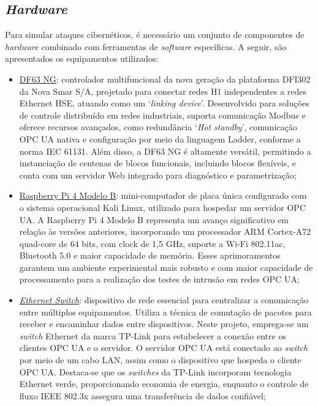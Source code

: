     \subsection{\textit{Hardware}}

        Para simular ataques cibernéticos, é necessário um conjunto de componentes de \textit{hardware} combinado com ferramentas de \textit{software} específicas. A seguir, são apresentados os equipamentos utilizados:

        \begin{itemize}
            \item \underline{DF63 NG}: controlador multifuncional da nova geração da plataforma DFI302 da Nova Smar S/A, projetado para conectar redes H1 independentes a redes Ethernet HSE, atuando como um `\textit{linking device}'. Desenvolvido para soluções de controle distribuído em redes industriais, suporta comunicação Modbus e oferece recursos avançados, como redundância `\textit{Hot standby}', comunicação OPC UA nativa e configuração por meio da linguagem Ladder, conforme a norma IEC 61131. Além disso, a DF63 NG é altamente versátil, permitindo a instanciação de centenas de blocos funcionais, incluindo blocos flexíveis, e conta com um servidor Web integrado para diagnóstico e parametrização;
            \item \underline{Raspberry Pi 4 Modelo B}: mini-computador de placa única configurado com o sistema operacional Kali Linux, utilizado para hospedar um servidor OPC UA. A Raspberry Pi 4 Modelo B representa um avanço significativo em relação às versões anteriores, incorporando um processador ARM Cortex-A72 quad-core de 64 bits, com clock de 1,5 GHz, suporte a Wi-Fi 802.11ac, Bluetooth 5.0 e maior capacidade de memória. Esses aprimoramentos garantem um ambiente experimental mais robusto e com maior capacidade de processamento para a realização dos testes de intrusão em redes OPC UA;
            \item \underline{\textit{Ethernet Switch}}: dispositivo de rede essencial para centralizar a comunicação entre múltiplos equipamentos. Utiliza a técnica de comutação de pacotes para receber e encaminhar dados entre dispositivos. Neste projeto, emprega-se um \textit{switch} Ethernet da marca TP-Link para estabelecer a conexão entre os clientes OPC UA e o servidor. O servidor OPC UA está conectado ao \textit{switch} por meio de um cabo LAN, assim como o dispositivo que hospeda o cliente OPC UA. Destaca-se que os \textit{switches} da TP-Link incorporam tecnologia Ethernet verde, proporcionando economia de energia, enquanto o controle de fluxo IEEE 802.3x assegura uma transferência de dados confiável;

\end{itemize}
